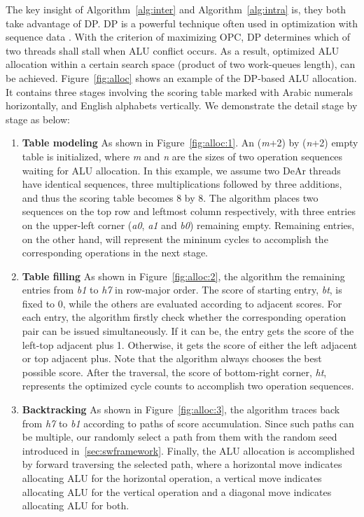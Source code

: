 \indent
The key insight of Algorithm~\ref{alg:inter} and Algorithm~\ref{alg:intra} is, they both take advantage of DP.
DP is a powerful technique often used in optimization with sequence data \cite{dpseq}.
With the criterion of maximizing OPC, DP determines which of two threads shall stall when ALU conflict occurs.
As a result, optimized ALU allocation within a certain search space (product of two work-queues length), can be achieved.
Figure~\ref{fig:alloc} shows an example of the DP-based ALU allocation.
It contains three stages involving the scoring table marked with Arabic numerals horizontally, and English alphabets vertically.
We demonstrate the detail stage by stage as below:
\begin{enumerate}
    \item \textbf{Table modeling} As shown in Figure~\ref{fig:alloc:1}. An (\textit{m}+2) by (\textit{n}+2) empty table is initialized, 
        where \textit{m} and \textit{n} are the sizes of two operation sequences waiting for ALU allocation.
        In this example, we assume two DeAr threads have identical sequences, three multiplications followed by three additions, 
        and thus the scoring table becomes 8 by 8.
        The algorithm places two sequences on the top row and leftmost column respectively, 
        with three entries on the upper-left corner (\textit{a0}, \textit{a1} and \textit{b0}) remaining empty. 
        Remaining entries, on the other hand, will represent the mininum cycles to accomplish the corresponding operations in the next stage.
    \item \textbf{Table filling} As shown in Figure~\ref{fig:alloc:2}, the algorithm the remaining entries from \textit{b1} to \textit{h7} in row-major order.
        The score of starting entry, \textit{bt}, is fixed to 0, while the others are evaluated according to adjacent scores.
        For each entry, the algorithm firstly check whether the corresponding operation pair can be issued simultaneously.
        If it can be, the entry gets the score of the left-top adjacent plus 1.
        Otherwise, it gets the score of either the left adjacent or top adjacent plus.
        Note that the algorithm always chooses the best possible score.
        After the traversal, the score of bottom-right corner, \textit{ht}, represents the optimized cycle counts to accomplish two operation sequences.
    \item \textbf{Backtracking} As shown in Figure~\ref{fig:alloc:3}, the algorithm traces back from \textit{h7} to \textit{b1} according to paths of score accumulation.
        Since such paths can be multiple, our randomly select a path from them with the random seed introduced in~\ref{sec:swframework}.
        Finally, the ALU allocation is accomplished by forward traversing the selected path, 
        where a horizontal move indicates allocating ALU for the horizontal operation,
        a vertical move indicates allocating ALU for the vertical operation and a diagonal move indicates allocating ALU for both.
\end{enumerate}

